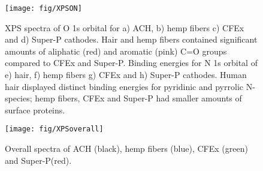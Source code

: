 \documentclass{article}
\begin{document}
\begin{figure}
  \centering
  \texttt{[image: fig/XPSON]}
    \caption{XPS spectra of O 1s orbital for a) ACH, b) hemp fibers c) CFEx and d) Super-P cathodes. Hair and hemp fibers contained significant amounts of aliphatic (red) and aromatic (pink) C=O groups  compared to CFEx and Super-P. Binding energies for N 1s orbital of e) hair, f) hemp fibers g) CFEx and h) Super-P cathodes. Human hair displayed distinct binding energies for pyridinic and pyrrolic N-species; hemp fibers, CFEx and Super-P had smaller amounts of surface proteins.}
  \label{fig:XPSON}
\end{figure}

\begin{figure}[th!]
\centering
\texttt{[image: fig/XPSoverall]}
\caption{Overall spectra of ACH (black), hemp fibers (blue), CFEx (green) and Super-P(red).}
\label{fig:XPSoverall}
\end{figure}
\end{document}

